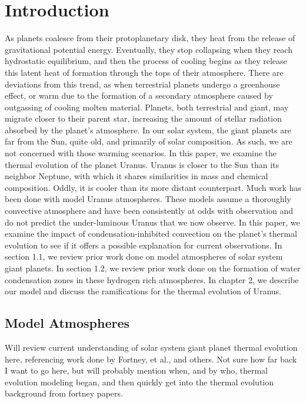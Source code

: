 \documentclass[11pt]{ucscthesisbs}
\begin{document}
\chapter{Introduction}
As planets coalesce from their protoplanetary disk, they heat from the release of gravitational potential energy. Eventually, they stop collapsing when they reach hydrostatic equilibrium, and then the process of cooling begins as they release this latent heat of formation through the tops of their atmosphere. There are deviations from this trend, as when terrestrial planets undergo a greenhouse effect, or warm due to the formation of a secondary atmosphere caused by outgassing of cooling molten material. Planets, both terrestrial and giant, may migrate closer to their parent star, increasing the amount of stellar radiation absorbed by the planet's atmosphere. In our solar system, the giant planets are far from the Sun, quite old, and primarily of solar composition. As such, we are not concerned with those warming scenarios. In this paper, we examine the thermal evolution of the planet Uranus. Uranus is closer to the Sun than its neighbor Neptune, with which it shares similarities in mass and chemical composition. Oddly, it is cooler than its more distant counterpart. Much work has been done with model Uranus atmospheres. These models assume a thoroughly convective atmosphere and have been consistently at odds with observation and do not predict the under-luminous Uranus that we now observe. In this paper, we examine the impact of condensation-inhibited convection on the planet's thermal evolution to see if it offers a possible explanation for current observations. In section 1.1, we review prior work done on model atmospheres of solar system giant planets. In section 1.2, we review prior work done on the formation of water condensation zones in these hydrogen rich atmospheres. In chapter 2, we describe our model and discuss the ramifications for the thermal evolution of Uranus.



\section{Model Atmospheres}

Will review current understanding of solar system giant planet thermal evolution here, referencing work done by Fortney, et al., and others. Not sure how far back I want to go here, but will probably mention when, and by who, thermal evolution modeling began, and then quickly get into the thermal evolution background from fortney papers.
\end{document}
